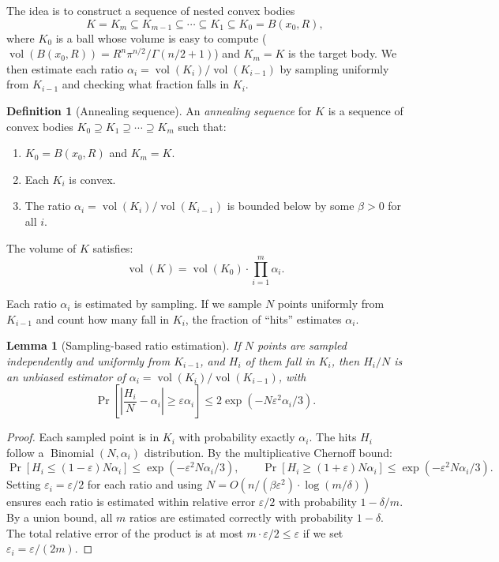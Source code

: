 \documentclass[twoside,12pt]{book}
\theoremstyle{plain}
\newtheorem{lemma}[theorem]{Lemma}
\theoremstyle{definition}
\newtheorem{definition}[theorem]{Definition}
\theoremstyle{remark}
\begin{document}
The idea is to construct a sequence of nested convex bodies
\[
K = K_m \subseteq K_{m-1} \subseteq \cdots \subseteq K_1 \subseteq K_0 = B(x_0, R),
\]
where $K_0$ is a ball whose volume is easy to compute ($\operatorname{vol}(B(x_0, R)) = R^n \pi^{n/2} / \Gamma(n/2 + 1)$) and $K_m = K$ is the target body. We then estimate each ratio $\alpha_i = \operatorname{vol}(K_i) / \operatorname{vol}(K_{i-1})$ by sampling uniformly from $K_{i-1}$ and checking what fraction falls in $K_i$.

\begin{definition}[Annealing sequence]
An \emph{annealing sequence} for $K$ is a sequence of convex bodies $K_0 \supseteq K_1 \supseteq \cdots \supseteq K_m$ such that:
\begin{enumerate}[nosep]
    \item $K_0 = B(x_0, R)$ and $K_m = K$.
    \item Each $K_i$ is convex.
    \item The ratio $\alpha_i = \operatorname{vol}(K_i)/\operatorname{vol}(K_{i-1})$ is bounded below by some $\beta > 0$ for all $i$.
\end{enumerate}
\end{definition}

The volume of $K$ satisfies:
\[
\operatorname{vol}(K) = \operatorname{vol}(K_0) \cdot \prod_{i=1}^m \alpha_i.
\]

Each ratio $\alpha_i$ is estimated by sampling. If we sample $N$ points uniformly from $K_{i-1}$ and count how many fall in $K_i$, the fraction of ``hits'' estimates $\alpha_i$.

\begin{lemma}[Sampling-based ratio estimation]
\label{lem:ratio-est}
If $N$ points are sampled independently and uniformly from $K_{i-1}$, and $H_i$ of them fall in $K_i$, then $H_i/N$ is an unbiased estimator of $\alpha_i = \operatorname{vol}(K_i)/\operatorname{vol}(K_{i-1})$, with
\[
\Pr\!\left[\left|\frac{H_i}{N} - \alpha_i\right| \geq \varepsilon \alpha_i\right] \leq 2 \exp(-N \varepsilon^2 \alpha_i / 3).
\]
\end{lemma}

\begin{proof}
Each sampled point is in $K_i$ with probability exactly $\alpha_i$. The hits $H_i$ follow a $\operatorname{Binomial}(N, \alpha_i)$ distribution. By the multiplicative Chernoff bound:
\[
\Pr[H_i \leq (1 - \varepsilon) N \alpha_i] \leq \exp(-\varepsilon^2 N \alpha_i / 3), \qquad \Pr[H_i \geq (1 + \varepsilon) N \alpha_i] \leq \exp(-\varepsilon^2 N \alpha_i / 3).
\]
Setting $\varepsilon_i = \varepsilon/2$ for each ratio and using $N = O(n / (\beta \varepsilon^2) \cdot \log(m/\delta))$ ensures each ratio is estimated within relative error $\varepsilon/2$ with probability $1 - \delta/m$. By a union bound, all $m$ ratios are estimated correctly with probability $1 - \delta$. The total relative error of the product is at most $m \cdot \varepsilon/2 \leq \varepsilon$ if we set $\varepsilon_i = \varepsilon/(2m)$.
\end{proof}
\end{document}
